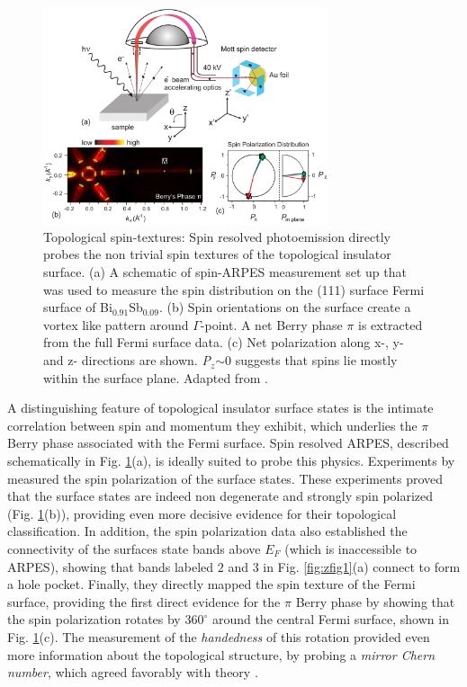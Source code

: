 \documentclass[twocolumn,floatfix,showpacs,rmp,aps]{revtex4}
\begin{document}
	\begin{figure}
		\includegraphics[width=3.3in]{Fig10}%
		\caption{Topological spin-textures:
			Spin resolved photoemission directly probes the non trivial spin textures
			of the topological insulator surface.
			(a) A schematic of spin-ARPES
			measurement set up that was used to measure the spin
			distribution on the (111) surface Fermi surface of
			Bi$_{0.91}$Sb$_{0.09}$.  (b) Spin orientations on the surface create a
			vortex like pattern around $\Gamma$-point. A net Berry phase
			$\pi$ is extracted from the full Fermi surface data.
			(c) Net polarization along x-, y- and z- directions are shown.
			\textit{P$_z$}$\sim$0 suggests that spins lie mostly within the
			surface plane.  Adapted from .  }
		\label{fig:zfig2} \end{figure}
	
	A distinguishing feature of topological insulator surface states is the
	intimate correlation between spin and momentum they exhibit, which underlies
	the $\pi$ Berry phase associated with the Fermi surface.  Spin resolved
	ARPES, described schematically in Fig. \ref{fig:zfig2}(a),
	is ideally suited to probe this physics.
	Experiments by \textcite{hsieh09a} measured the spin polarization of the surface
	states.  These experiments proved that the surface states are indeed
	non degenerate and strongly spin polarized (Fig. \ref{fig:zfig2}(b)),
	providing even more decisive
	evidence for their topological classification.
	In addition, the spin polarization
	data also established the connectivity of the
	surfaces state bands above $E_F$ (which is inaccessible to ARPES),
	showing that bands labeled $2$ and $3$ in Fig. \ref{fig:zfig1}(a) connect to
	form a hole pocket.    Finally, they directly mapped
	the spin texture of the Fermi surface,
	providing the first direct evidence for
	the $\pi$ Berry phase by showing that the spin polarization rotates by
	$360^\circ$ around the central Fermi surface, shown in
	Fig. \ref{fig:zfig2}(c).  The measurement of the {\it handedness} of this
	rotation provided even more information about the topological structure,
	by probing a {\it mirror Chern number}, which agreed favorably with theory \cite{teofukane08}.
	
\end{document}
